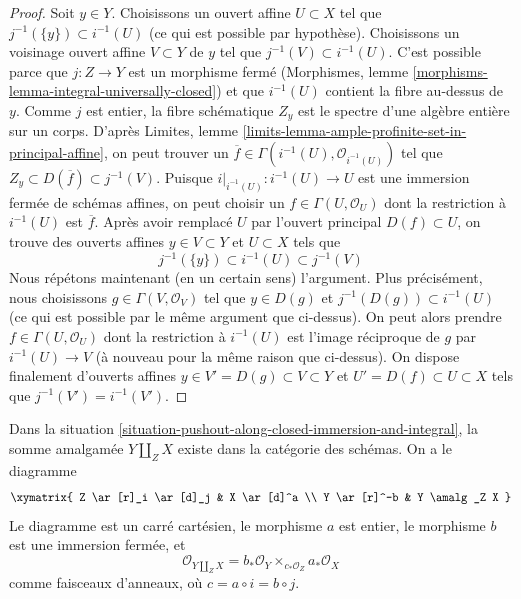 \begin{proof}
Soit $y \in Y$. Choisissons un ouvert affine $U \subset X$
tel que $j^{-1}(\{y\}) \subset i^{-1}(U)$ (ce qui est possible par hypothèse).
Choisissons un voisinage ouvert affine $V \subset Y$ de $y$
tel que $j^{-1}(V) \subset i^{-1}(U)$.
C'est possible parce que $j : Z \to Y$ est un morphisme fermé
(Morphismes, lemme \ref{morphisms-lemma-integral-universally-closed}) et que
$i^{-1}(U)$ contient la fibre au-dessus de $y$.
Comme $j$ est entier, la fibre schématique $Z_y$
est le spectre d'une algèbre entière sur un corps.
D'après Limites, lemme \ref{limits-lemma-ample-profinite-set-in-principal-affine},
on peut trouver un $\overline{f} \in \Gamma(i^{-1}(U), \mathcal{O}_{i^{-1}(U)})$
tel que $Z_y \subset D(\overline{f}) \subset j^{-1}(V)$.
Puisque $i|_{i^{-1}(U)} : i^{-1}(U) \to U$ est une immersion fermée
de schémas affines, on peut choisir un $f \in \Gamma(U, \mathcal{O}_U)$
dont la restriction à $i^{-1}(U)$ est $\overline{f}$.
Après avoir remplacé $U$ par l'ouvert principal $D(f) \subset U$,
on trouve des ouverts affines $y \in V \subset Y$ et $U \subset X$ tels que
$$
j^{-1}(\{y\}) \subset i^{-1}(U) \subset j^{-1}(V)
$$
Nous répétons maintenant (en un certain sens) l'argument. Plus précisément, nous choisissons
$g \in \Gamma(V, \mathcal{O}_V)$ tel que $y \in D(g)$ et
$j^{-1}(D(g)) \subset i^{-1}(U)$ (ce qui est possible par le même argument
que ci-dessus). On peut alors prendre $f \in \Gamma(U, \mathcal{O}_U)$
dont la restriction à $i^{-1}(U)$ est l'image réciproque de $g$
par $i^{-1}(U) \to V$ (à nouveau pour la même raison que ci-dessus).
On dispose finalement d'ouverts affines $y \in V' = D(g) \subset V \subset Y$
et $U' = D(f) \subset U \subset X$ tels que $j^{-1}(V') = i^{-1}(V')$.
\end{proof}

\begin{proposition}
\label{proposition-pushout-along-closed-immersion-and-integral}
\begin{reference}
\cite[Théorème 7.1, partie iii]{Ferrand-Conducteur}
\end{reference}
Dans la situation \ref{situation-pushout-along-closed-immersion-and-integral},
la somme amalgamée $Y \amalg_Z X$ existe dans la catégorie des schémas. On a le diagramme
$$
\xymatrix{
Z \ar[r]_i \ar[d]_j & X \ar[d]^a \\
Y \ar[r]^-b & Y \amalg_Z X
}
$$
Le diagramme est un carré cartésien, le morphisme $a$ est entier,
le morphisme $b$ est une immersion fermée, et
$$
\mathcal{O}_{Y \amalg_Z X} =
b_*\mathcal{O}_Y \times_{c_*\mathcal{O}_Z} a_*\mathcal{O}_X
$$
comme faisceaux d'anneaux, où $c = a \circ i = b \circ j$.
\end{proposition}

